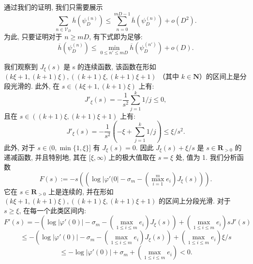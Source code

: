 通过我们的证明, 我们只需要展示
\begin{equation*}
\sum_{n \in \mathcal{V}_D} \overline{h}(\psi_D^{(n)}) \le \sum_{n=0}^{mD-1} \overline{h}(\psi_D^{(n)}) + o(D^2).
\end{equation*}
为此, 只要证明对于 \(n \geq mD\), 有下式即为足够:
\begin{equation}\label{eq:7.7.3}
\overline{h}(\psi_D^{(n)}) \le \min_{0 \le n' \le mD} \overline{h}(\psi_D^{(n')}) + o(D). 
\end{equation}

我们观察到 \(J_{\xi}(s)\) 是 s 的连续函数, 
该函数在形如 \((k\xi+1, (k+1)\xi), ((k+1)\xi, (k+1)\xi+1)\) （其中 \(k\in\mathbf{N}\)）的区间上是分段光滑的. 
此外, 在 \(s \in (k\xi + 1, (k+1)\xi)\) 上有:
\[ J'_{\xi}(s) = -\frac{1}{s^2} \sum_{j=1}^{k} 1/j \le 0, \]
且在 \(s \in ((k+1)\xi, (k+1)\xi+1)\) 上有:
\[ J'_{\xi}(s) = -\frac{1}{s^2} \left( -\xi + \sum_{j=1}^k 1/j \right) \le \xi/s^2. \]
此外, 对于 \(s \in (0, \min\{1, \xi\}]\) 有 \(J_{\xi}(s) = 0\). 
因此 \(J_{\xi}(s) + \xi/s\) 是 \(s \in \mathbf{R}_{>0}\) 的递减函数, 
并且特别地, 其在 \([\xi, \infty)\) 上的极大值取在 \(s = \xi\) 处, 值为 1. 
我们分析函数
\[ F(s) := -s \left( \left( \log |\varphi'(0| - \sigma_m - (\max_{i=1}^m e_i) J_{\xi}(s) \right) \right). \]
它在 \(s \in \mathbf{R}_{>0}\) 上是连续的, 并在形如 \((k\xi + 1, (k+1)\xi), ((k+1)\xi, (k+1)\xi + 1)\) 的区间上分段光滑. 
对于 \(s \geq \xi\), 在每一个此类区间内:
\[ F'(s) = -\left(\log |\varphi'(0)| - \sigma_m - \left(\max_{1 \le i \le m} e_i\right) J_{\xi}(s)\right) + \left(\max_{1 \le i \le m} e_i\right) s J'(s) \]
\[ \leq -\left(\log |\varphi'(0)| - \sigma_m - \left(\max_{1 \le i \le m} e_i\right) J_{\xi}(s)\right) + \left(\max_{1 \le i \le m} e_i\right) \xi/s \]
\[ \leq -\log |\varphi'(0)| + \sigma_m + \left(\max_{1 \le i \le m} e_i\right) < 0. \]

